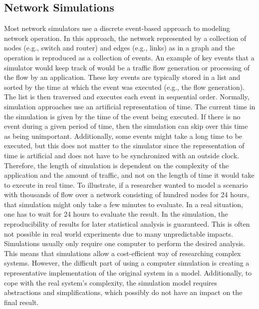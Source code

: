 \subsection{Network Simulations}
Most network simulators use a discrete event-based approach to modeling network operation. In this approach, the network represented by a collection of nodes (e.g., switch and router) and edges (e.g., links) as in a graph and the operation is reproduced as a collection of events. An example of key events that a simulator would keep track of would be a traffic flow generation or processing of the flow by an application. These key events are typically stored in a list and sorted by the time at which the event was executed (e.g., the flow generation). The list is then traversed and executes each event in sequential order. Normally, simulation approaches use an artificial representation of time. The current time in the simulation is given by the time of the event being executed. If there is no event during a given period of time, then the simulation can skip over this time as being unimportant. Additionally, some events might take a long time to be executed, but this does not matter to the simulator since the representation of time is artificial and does not have to be synchronized with an outside clock. Therefore, the length of simulation is dependent on the complexity of the application and the amount of traffic, and not on the length of time it would take to execute in real time. To illustrate, if a researcher wanted to model a scenario with thousands of flow over a network consisting of hundred nodes for 24 hours, that simulation might only take a few minutes to evaluate. In a real situation, one has to wait for 24 hours to evaluate the result. In the simulation, the reproducibility of results for later statistical analysis is guaranteed. This is often not possible in real world experiments due to many unpredictable impacts. Simulations usually only require one computer to perform the desired analysis. This means that simulations allow a cost-efficient way of researching complex systems. However, the difficult part of using a computer simulation is creating a representative implementation of the original system in a model. Additionally, to cope with the real system's complexity, the simulation model requires abstractions and simplifications, which possibly do not have an impact on the final result.

